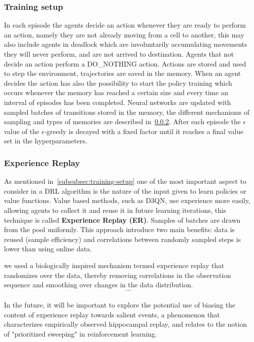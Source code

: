 \documentclass[11pt, a4paper, hidelinks]{report}
\begin{document}
\subsubsection{Training setup}

In each episode the agents decide an action whenever they are ready to perform an action, namely they are not already moving from a cell to another, this may also include agents in deadlock which are involuntarily accumulating movements they will never perform, and are not arrived to destination.
Agents that not decide an action perform a DO\_NOTHING action.
Actions are stored and used to step the environment, trajectories are saved in the memory.
When an agent decides the action has also the possibility to start the policy training which occurs whenever the memory has reached a certain size and every time an interval of episodes has been completed.
Neural networks are updated with sampled batches of transitions stored in the memory, the different mechanisms of sampling and types of memories are described in~\ref{subsubsec:experience-replay}.
After each episode the $\epsilon$ value of the $\epsilon$-greedy is decayed with a fixed factor until it reaches a final value set in the hyperparameters.

\subsubsection{Experience Replay}\label{subsubsec:experience-replay}

As mentioned in~\ref{subsubsec:training-setup} one of the most important aspect to consider in a DRL algorithm is the nature of the input given to learn policies or value functions.
Value based methods, such as D3QN, use experience more easily, allowing agents to collect it and reuse it in future learning iterations, this technique is called \textbf{Experience Replay (ER)}.
Samples of batches are drawn from the pool uniformly.
This approach introduce two main benefits: data is reused (sample efficiency) and correlations between randomly sampled steps is lower than using online data.

\begin{quoting}[font=itshape, begintext={"}, endtext={"\citep{human-level}}]
we used a biologically inspired mechanism termed experience replay that randomizes over the data, thereby removing correlations in the observation sequence and smoothing over changes in the data distribution.\\
\[\dots\]\\
In the future, it will be important to explore the potential use of biasing the content of experience replay towards salient events, a phenomenon that characterizes empirically observed hippocampal replay, and relates to the notion of "prioritized sweeping" in reinforcement learning.
\end{quoting}
\end{document}
